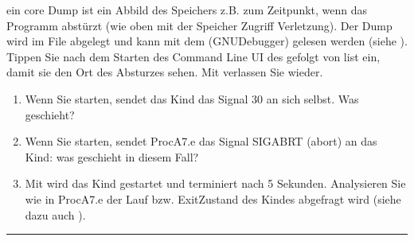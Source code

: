\documentclass[a4paper,10pt,english]{report}
\begin{document}
\sphinxAtStartPar
{} ein core Dump ist ein Abbild des Speichers z.B. zum Zeitpunkt, wenn das Programm abstürzt (wie oben mit der Speicher Zugriff Verletzung). Der Dump wird im File  abgelegt und kann mit dem  (GNU\sphinxhyphen{}Debugger) gelesen werden (siehe ). Tippen Sie nach dem Starten des Command Line UI des  gefolgt von list ein, damit sie den Ort des Absturzes sehen. Mit  verlassen Sie  wieder.
\begin{enumerate}
%
\item {} 
\sphinxAtStartPar
Wenn Sie  starten, sendet das Kind das Signal 30 an sich selbst. Was geschieht?

\begin{sphinxVerbatim}[commandchars=\\\{\}]

\end{sphinxVerbatim}

\item {} 
\sphinxAtStartPar
Wenn Sie  starten, sendet ProcA7.e das Signal SIGABRT (abort) an das Kind: was geschieht in diesem Fall?

\begin{sphinxVerbatim}[commandchars=\\\{\}]

\end{sphinxVerbatim}

\item {} 
\sphinxAtStartPar
Mit  wird das Kind gestartet und terminiert nach 5 Sekunden. Analysieren Sie wie in ProcA7.e der Lauf\sphinxhyphen{} bzw. Exit\sphinxhyphen{}Zustand des Kindes abgefragt wird (siehe dazu auch ).

\begin{sphinxVerbatim}[commandchars=\\\{\}]

\end{sphinxVerbatim}

\end{enumerate}


\bigskip\hrule\bigskip
\end{document}
